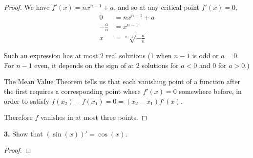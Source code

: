 \documentclass{article}
\newcommand{\problem}[1]{\noindent \textbf{#1}}
\begin{document}
\begin{proof}
    We have $f'(x) = nx^{n - 1} + a$, and so at any critical point $f'(x) = 0$, 
    \begin{align*}
        0 &= nx^{n - 1} + a \\
        -\frac{a}{n} &= x^{n - 1} \\
        x &= \sqrt[n - 1]{-\frac{a}{n}}
    \end{align*}

    Such an expression has at most $2$ real solutions (1 when $n - 1$ is odd or $a = 0$. For $n - 1$ even, it depends on the sign of $a$: 2 solutions for $a < 0$ and $0$ for $a > 0$.)

    The Mean Value Theorem tells us that each vanishing point of a function after the first requires a corresponding point where $f'(x) = 0$ somewhere before, in order to satisfy $f(x_2) - f(x_1) = 0 = (x_2 - x_1)f'(x)$.

    Therefore $f$ vanishes in at most three points.    
\end{proof}


\problem{3. }
Show that $(\sin(x))' = \cos(x)$.
\begin{proof}
    
\end{proof}

\end{document}
